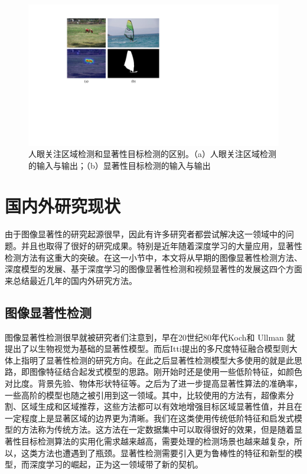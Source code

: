 \begin{figure}
\center
\includegraphics[width=1\textwidth]{figures/eyePredict}
\caption{人眼关注区域检测和显著性目标检测的区别。（a）人眼关注区域检测的输入与输出；（b）显著性目标检测的输入与输出}
\label{eye}
\end{figure}

\section{国内外研究现状}
由于图像显著性的研究起源很早，因此有许多研究者都尝试解决这一领域中的问题。并且也取得了很好的研究成果。特别是近年随着深度学习的大量应用，显著性检测方法有这重大的突破。在这一小节中，本文将从早期的图像显著性检测方法、深度模型的发展、基于深度学习的图像显著性检测和视频显著性的发展这四个方面来总结最近几年的国内外研究方法。

\subsection{图像显著性检测}

图像显著性检测很早就被研究者们注意到，早在20世纪80年代Koch和 Ullman \cite{koch1987shifts}就提出了以生物视觉为基础的显著性模型。而后Itti提出的多尺度特征融合模型\cite{itti2001computational}则大体上指明了显著性检测的研究方向。在此之后显著性检测模型大多使用的就是此思路，即图像特征结合起发式模型的思路\cite{zhu2014saliency,jiang2013salient,peng2017salient}。刚开始时还是使用一些低阶特征，如颜色对比度\cite{cheng2015global}。背景先验\cite{wei2012geodesic}、物体形状特征\cite{jiang2011automatic}等。之后为了进一步提高显著性算法的准确率，一些高阶的模型也随之被引用到这一领域。其中，比较使用的方法有，超像素分割\cite{Wang2016Correspondence}、区域生成\cite{HierarchicalYan}和区域推荐\cite{8082546}，这些方法都可以有效地增强目标区域显著性值，并且在一定程度上是显著区域的边界更为清晰。我们在这类使用传统低阶特征和启发式模型的方法称为传统方法。这方法在一定数据集中可以取得很好的效果，但是随着显著性目标检测算法的实用化需求越来越高，需要处理的检测场景也越来越复杂，所以，这类方法也遭遇到了瓶颈。显著性检测需要引入更为鲁棒性的特征和新型的模型，而深度学习的崛起，正为这一领域带了新的契机。

